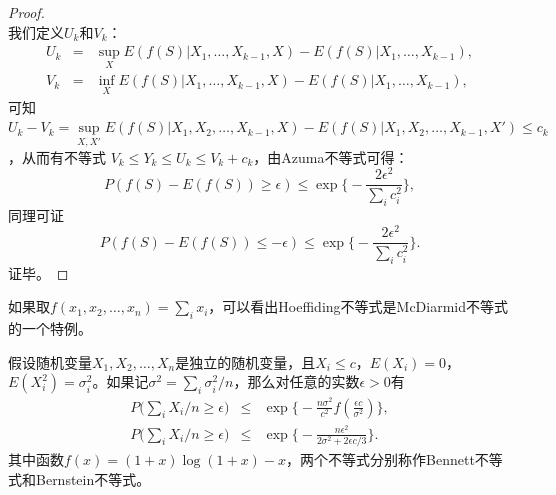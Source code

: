 \begin{proof}
\[\]
我们定义$U_k$和$V_k$：
\begin{eqnarray}
  \nonumber U_k &=& \sup\limits_X E (f(S) |X_1,\ldots,X_{k-1},X ) - E (f(S) |X_1,\ldots,X_{k-1}), \\
  \nonumber V_k &=& \inf\limits_X E (f(S) |X_1,\ldots,X_{k-1},X ) - E (f(S) |X_1,\ldots,X_{k-1}),
\end{eqnarray}
可知$U_k-V_k=\sup\limits_{X, X'} E (f(S) |X_1,X_2,\ldots,X_{k-1},X ) - E (f(S) |X_1,X_2,\ldots,X_{k-1},X')\le c_k$，从而有不等式
$V_k\le Y_k \le U_k \le V_k + c_k$，由Azuma不等式可得：
\[
    P(f(S) - E(f(S)) \ge \epsilon) \le \exp\big\{-\frac{2\epsilon^2}{\sum\limits_i c_i^2}\big\},
\]
同理可证
\[
    P(f(S) - E(f(S)) \le -\epsilon) \le \exp\big\{-\frac{2\epsilon^2}{\sum\limits_i c_i^2}\big\}.
\]
证毕。
\end{proof}
如果取$f(x_1,x_2,\ldots, x_n) = \sum\limits_i x_i$，可以看出Hoeffiding不等式是McDiarmid不等式的一个特例。

\begin{theorem}[Bennett不等式和Bernstein不等式]
假设随机变量$X_1,X_2,\ldots,X_n$是独立的随机变量，且$X_i\le c$，$E (X_i) = 0$，$E (X_i^2) = \sigma_i^2$。如果记$\sigma^2 = \sum\limits_i \sigma_i^2/n$，那么对任意的实数$\epsilon>0$有
\begin{eqnarray}
  P\big(\sum\limits_i X_i/n \ge \epsilon\big) &\le & \exp\bigg\{-\frac{n\sigma^2}{c^2}f(\frac{\epsilon c}{\sigma^2})\bigg\}, \\
  P\big(\sum\limits_i X_i/n \ge \epsilon\big) &\le & \exp\bigg\{-\frac{n\epsilon^2}{2\sigma^2 + 2\epsilon c/3}\bigg\}.
\end{eqnarray}
其中函数$f(x)=(1+x)\log(1+x)-x$，两个不等式分别称作Bennett不等式和Bernstein不等式。
\end{theorem}

